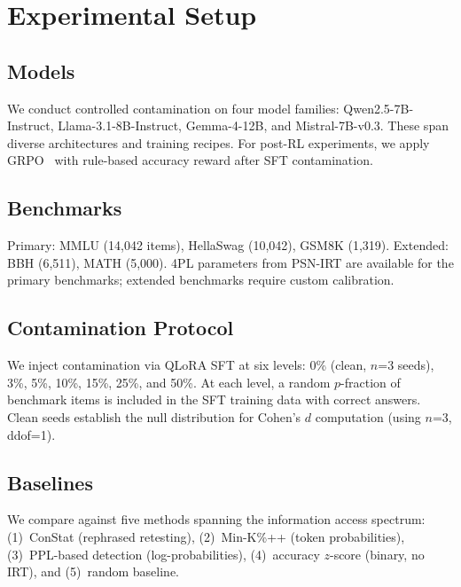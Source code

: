 \documentclass[11pt,a4paper]{article}
\begin{document}
\section{Experimental Setup}

\subsection{Models}

We conduct controlled contamination on four model families: Qwen2.5-7B-Instruct, Llama-3.1-8B-Instruct, Gemma-4-12B, and Mistral-7B-v0.3.
These span diverse architectures and training recipes.
For post-RL experiments, we apply GRPO~\citep{shao2024deepseekmath} with rule-based accuracy reward after SFT contamination.

\subsection{Benchmarks}

Primary: MMLU (14,042 items), HellaSwag (10,042), GSM8K (1,319).
Extended: BBH (6,511), MATH (5,000).
4PL parameters from PSN-IRT are available for the primary benchmarks; extended benchmarks require custom calibration.

\subsection{Contamination Protocol}

We inject contamination via QLoRA SFT at six levels: 0\% (clean, $n$=3 seeds), 3\%, 5\%, 10\%, 15\%, 25\%, and 50\%.
At each level, a random $p$-fraction of benchmark items is included in the SFT training data with correct answers.
Clean seeds establish the null distribution for Cohen's $d$ computation (using $n$=3, ddof=1).

\subsection{Baselines}

We compare against five methods spanning the information access spectrum:
(1)~ConStat (rephrased retesting), (2)~Min-K\%++ (token probabilities), (3)~PPL-based detection (log-probabilities), (4)~accuracy $z$-score (binary, no IRT), and (5)~random baseline.

\end{document}
